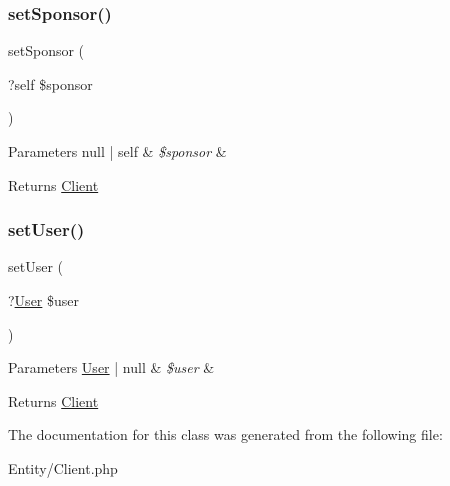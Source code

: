 \subsubsection{\texorpdfstring{setSponsor()}{setSponsor()}}
{\footnotesize\ttfamily set\+Sponsor (\begin{DoxyParamCaption}\item[{?self}]{\$sponsor }\end{DoxyParamCaption})}


\begin{DoxyParams}[1]{Parameters}
null | self & {\em \$sponsor} & \\
\hline
\end{DoxyParams}
\begin{DoxyReturn}{Returns}
\mbox{\hyperlink{class_app_1_1_entity_1_1_client}{Client}} 
\end{DoxyReturn}
\mbox{\label{class_app_1_1_entity_1_1_client_a406a111868b45aad6d4c8ab5b0c5bcb9}} 
\subsubsection{\texorpdfstring{setUser()}{setUser()}}
{\footnotesize\ttfamily set\+User (\begin{DoxyParamCaption}\item[{?\mbox{\hyperlink{class_app_1_1_entity_1_1_user}{User}}}]{\$user }\end{DoxyParamCaption})}


\begin{DoxyParams}[1]{Parameters}
\mbox{\hyperlink{class_app_1_1_entity_1_1_user}{User}} | null & {\em \$user} & \\
\hline
\end{DoxyParams}
\begin{DoxyReturn}{Returns}
\mbox{\hyperlink{class_app_1_1_entity_1_1_client}{Client}} 
\end{DoxyReturn}


The documentation for this class was generated from the following file\+:\begin{DoxyCompactItemize}
\item 
Entity/Client.\+php\end{DoxyCompactItemize}
